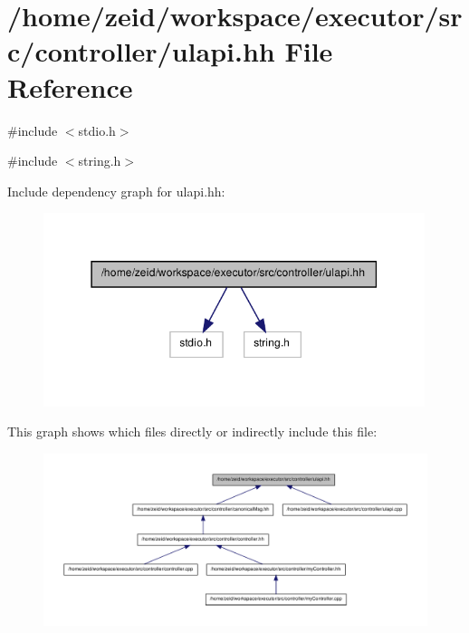 \hypertarget{ulapi_8hh}{
\section{/home/zeid/workspace/executor/src/controller/ulapi.hh File Reference}
\label{ulapi_8hh}
}
{\ttfamily \#include $<$stdio.h$>$}\par
{\ttfamily \#include $<$string.h$>$}\par
Include dependency graph for ulapi.hh:\nopagebreak
\begin{figure}[H]
\begin{center}
\leavevmode
\includegraphics[width=316pt]{ulapi_8hh__incl}
\end{center}
\end{figure}
This graph shows which files directly or indirectly include this file:\nopagebreak
\begin{figure}[H]
\begin{center}
\leavevmode
\includegraphics[width=400pt]{ulapi_8hh__dep__incl}
\end{center}
\end{figure}
